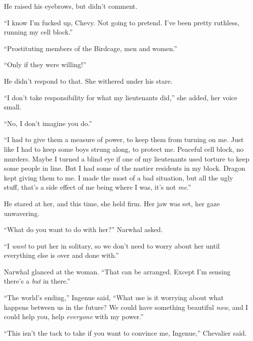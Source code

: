 He raised his eyebrows, but didn't comment.



``I know I'm fucked up, Chevy.  Not going to pretend.  I've been pretty ruthless, running my cell block.''



``Prostituting members of the Birdcage, men and women.''



``Only if they were willing!''



He didn't respond to that.  She withered under his stare.



``I don't take responsibility for what my lieutenants did,'' she added, her voice small.



``No, I don't imagine you do.''



``I had to give them a measure of power, to keep them from turning on me.  Just like I had to keep some boys strung along, to protect me.  Peaceful cell block, no murders.  Maybe I turned a blind eye if one of my lieutenants used torture to keep some people in line.  But I had some of the nastier residents in my block.  Dragon kept giving them to me.  I made the most of a bad situation, but all the ugly stuff, that's a side effect of me being where I was, it's not \emph{me}.''



He stared at her, and this time, she held firm.  Her jaw was set, her gaze unwavering.



``What do you want to do with her?'' Narwhal asked.



``I \emph{want} to put her in solitary, so we don't need to worry about her until everything else is over and done with.''



Narwhal glanced at the woman.  ``That can be arranged.  Except I'm sensing there's a \emph{but} in there.''



``The world's ending,'' Ingenue said,  ``What use is it worrying about what happens between us in the future?  We could have something beautiful \emph{now}, and I could help you, help \emph{everyone} with my power.''



``This isn't the tack to take if you want to convince me, Ingenue,'' Chevalier said.



